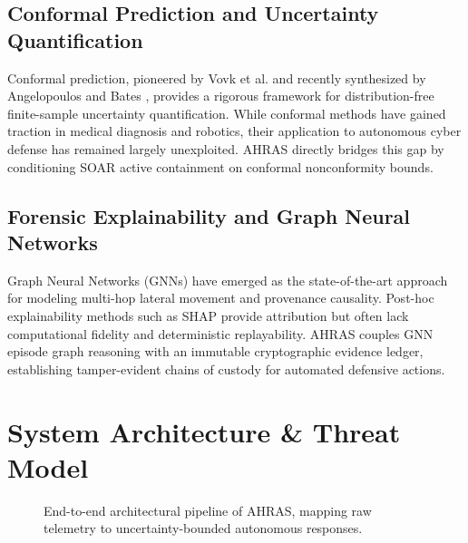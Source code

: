 \documentclass[10pt,journal,compsoc]{IEEEtran}
\begin{document}
\subsection{Conformal Prediction and Uncertainty Quantification}
Conformal prediction, pioneered by Vovk et al. \cite{vovk2005algorithmic} and recently synthesized by Angelopoulos and Bates \cite{angelopoulos2021gentle}, provides a rigorous framework for distribution-free finite-sample uncertainty quantification. While conformal methods have gained traction in medical diagnosis and robotics, their application to autonomous cyber defense has remained largely unexploited. AHRAS directly bridges this gap by conditioning SOAR active containment on conformal nonconformity bounds.

\subsection{Forensic Explainability and Graph Neural Networks}
Graph Neural Networks (GNNs) \cite{kipf2017semi} have emerged as the state-of-the-art approach for modeling multi-hop lateral movement and provenance causality. Post-hoc explainability methods such as SHAP \cite{lundberg2017unified} provide attribution but often lack computational fidelity and deterministic replayability. AHRAS couples GNN episode graph reasoning with an immutable cryptographic evidence ledger, establishing tamper-evident chains of custody for automated defensive actions.

\section{System Architecture \& Threat Model}

\begin{figure}[t]
\centering
{}
\caption{End-to-end architectural pipeline of AHRAS, mapping raw telemetry to uncertainty-bounded autonomous responses.}
\label{fig:architecture}
\end{figure}
\end{document}
